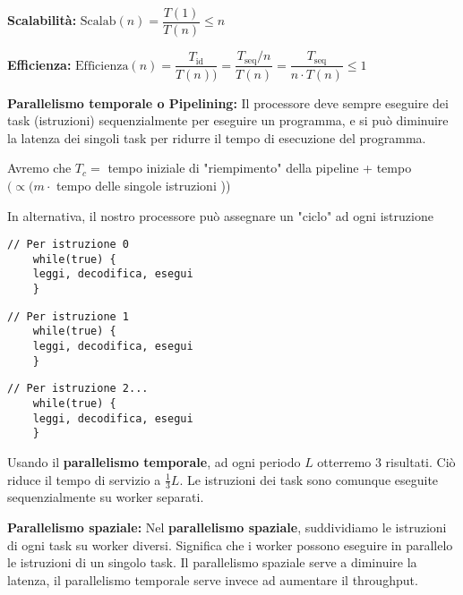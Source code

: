 \begin{defn}
	\textbf{Scalabilità:} $ \text{Scalab}(n) = \dfrac{T(1)}{T(n)} \leq n $
\end{defn}

\begin{defn}
	\textbf{Efficienza:}
	$ \text{Efficienza}(n) = \dfrac{T_{\text{id}}}{T(n))} =
	\dfrac{T_{\text{seq}}/n}{T(n)} = \dfrac{T_{\text{seq}}}{n \cdot T(n)} \leq 1
	$
\end{defn}


\begin{defn}
	\textbf{Parallelismo temporale o Pipelining:} Il processore deve sempre
	eseguire dei task (istruzioni) sequenzialmente per eseguire un programma, e
	si può diminuire la latenza dei singoli task per ridurre il tempo di
	esecuzione del programma.
	

	Avremo che $ T_c = $ tempo iniziale di "riempimento" della pipeline + tempo
	$ ( \propto ( m \cdot $ tempo delle singole istruzioni )) 

	In alternativa, il nostro processore può assegnare un "ciclo" ad ogni
	istruzione
	
	\begin{lstlisting}[frame=single]
	// Per istruzione 0
	while(true) {
	leggi, decodifica, esegui
	}
	\end{lstlisting} 
	\begin{lstlisting}[frame=single]
	// Per istruzione 1
	while(true) {
	leggi, decodifica, esegui
	}
	\end{lstlisting} 
	\begin{lstlisting}[frame=single]
	// Per istruzione 2...
	while(true) {
	leggi, decodifica, esegui
	}
	\end{lstlisting} 
	
	
	Usando il \textbf{parallelismo temporale}, ad ogni periodo $ L $ otterremo 3
	risultati. Ciò riduce il tempo di servizio a $ \frac{1}{3}L $. Le istruzioni
	dei task sono comunque eseguite sequenzialmente su worker separati.
\end{defn}



\begin{defn}
	\textbf{Parallelismo spaziale:}
	Nel \textbf{parallelismo spaziale}, suddividiamo le istruzioni di ogni task
	su worker diversi. Significa che i worker possono eseguire in parallelo le
	istruzioni di un singolo task. Il parallelismo spaziale serve a diminuire la
	latenza, il parallelismo temporale serve invece ad aumentare il throughput.
	
\end{defn}

